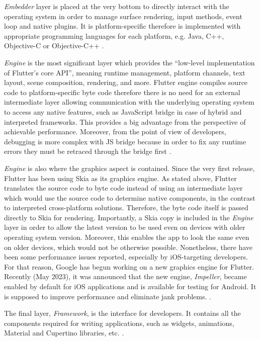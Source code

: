 \emph{Embedder} layer is placed at the very bottom to directly interact with the operating system in order to manage surface rendering, input methods, event loop and native plugins. It is platform-specific therefore is implemented with appropriate programming languages for each platform, e.g. Java, C++, Objective-C or Objective-C++ \cite{flutter_docs_architecture}.

\emph{Engine} is the most significant layer which provides the ``low-level implementation of Flutter's core API'', meaning runtime management, platform channels, text layout, scene composition, rendering, and more. Flutter engine compiles source code to platform-specific byte code therefore there is no need for an external intermediate layer allowing communication with the underlying operating system to access any native features, such as JavaScript bridge in case of hybrid and interpreted frameworks. This provides a big advantage from the perspective of achievable performance. Moreover, from the point of view of developers, debugging is more complex with JS bridge because in order to fix any runtime errors they must be retraced through the bridge first \cite{flutter_docs_architecture,windmill_flutter_in_action}.

\emph{Engine} is also where the graphics aspect is contained. Since the very first release, Flutter has been using Skia as its graphics engine. As stated above, Flutter translates the source code to byte code instead of using an intermediate layer which would use the source code to determine native components, in the contrast to interpreted cross-platform solutions. Therefore, the byte code itself is passed directly to Skia for rendering. Importantly, a Skia copy is included in the \emph{Engine} layer in order to allow the latest version to be used even on devices with older operating system version. Moreover, this enables the app to look the same even on older devices, which would not be otherwise possible. Nonetheless, there have been some performance issues reported, especially by iOS-targeting developers. For that reason, Google has begun working on a new graphics engine for Flutter. Recently (May 2023), it was announced that the new engine, \emph{Impeller}, became enabled by default for iOS applications and is available for testing for Android. It is supposed to improve performance and eliminate jank problems.
\cite{flutter_docs_architecture,flutter_impeller,kosinski_flutter_vs_rn_vs_qt}.

The final layer, \emph{Framework}, is the interface for developers. It contains all the components required for writing applications, such as widgets, animations, Material and Cupertino libraries, etc. \cite{flutter_docs_architecture}.

